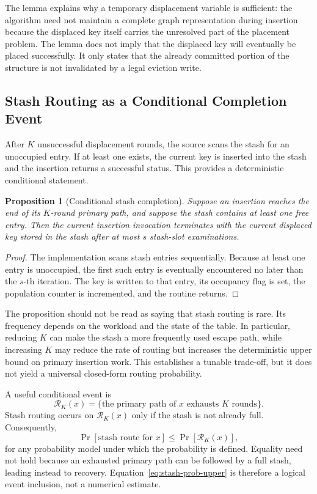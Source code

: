 \documentclass[conference]{IEEEtran}
\newtheorem{proposition}{Proposition}
\begin{document}
The lemma explains why a temporary displacement variable is sufficient: the algorithm need not maintain a complete graph representation during insertion because the displaced key itself carries the unresolved part of the placement problem. The lemma does not imply that the displaced key will eventually be placed successfully. It only states that the already committed portion of the structure is not invalidated by a legal eviction write.

\subsection{Stash Routing as a Conditional Completion Event}

After $K$ unsuccessful displacement rounds, the source scans the stash for an unoccupied entry. If at least one exists, the current key is inserted into the stash and the insertion returns a successful status. This provides a deterministic conditional statement.

\begin{proposition}[Conditional stash completion]
Suppose an insertion reaches the end of its $K$-round primary path, and suppose the stash contains at least one free entry. Then the current insertion invocation terminates with the current displaced key stored in the stash after at most $s$ stash-slot examinations.
\end{proposition}

\begin{proof}
The implementation scans stash entries sequentially. Because at least one entry is unoccupied, the first such entry is eventually encountered no later than the $s$-th iteration. The key is written to that entry, its occupancy flag is set, the population counter is incremented, and the routine returns.
\end{proof}

The proposition should not be read as saying that stash routing is rare. Its frequency depends on the workload and the state of the table. In particular, reducing $K$ can make the stash a more frequently used escape path, while increasing $K$ may reduce the rate of routing but increases the deterministic upper bound on primary insertion work. This establishes a tunable trade-off, but it does not yield a universal closed-form routing probability.

A useful conditional event is
\begin{equation}
    \mathcal{R}_K(x)=\{\text{the primary path of }x\text{ exhausts }K\text{ rounds}\}.
\end{equation}
Stash routing occurs on $\mathcal{R}_K(x)$ only if the stash is not already full. Consequently,
\begin{equation}
    \Pr[\text{stash route for }x]
    \le \Pr[\mathcal{R}_K(x)],
    \label{eq:stash-prob-upper}
\end{equation}
for any probability model under which the probability is defined. Equality need not hold because an exhausted primary path can be followed by a full stash, leading instead to recovery. Equation~\eqref{eq:stash-prob-upper} is therefore a logical event inclusion, not a numerical estimate.
\end{document}
